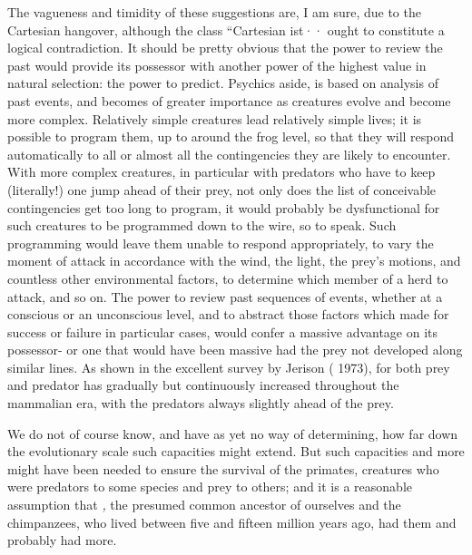 The vagueness and timidity of these suggestions are, I am sure, due to the Cartesian hangover, although the class ``Cartesian \-ist·· ought to constitute a logical contradiction. It should be pretty
obvious that the power to review the past would provide its possessor with another power of the highest value in natural selection: the power to predict. Psychics aside,  is based on analysis of past events, and becomes of greater importance as creatures evolve and become more complex. Relatively simple creatures lead relatively simple lives; it is possible to program them, up to around the frog level, so that they will respond automatically to all or almost all the contingencies they are likely to encounter. With more complex crea\-tures, in particular with predators who have to keep (literally!) one jump ahead of their prey, not only does the list of conceivable contin\-gencies get too long to program, it would probably be dysfunctional for such creatures to be programmed down to the wire, so to speak. Such programming would leave them unable to respond appropriately, to vary the moment of attack in accordance with the wind, the light, the prey's motions, and countless other environmental factors, to determine which member of a herd to attack, and so on. The power to review past sequences of events, whether at a conscious or an un\-conscious level, and to abstract those factors which made for success or failure in particular cases, would confer a massive advantage on its possessor- or one that would have been massive had the prey not de\-veloped along similar lines. As shown in the excellent survey by Jerison ( 1973),  for both prey and predator has gradually but con\-tinuously increased throughout the mammalian era, with the predators always slightly ahead of the prey.

We do not of course know, and have as yet no way of determin\-ing, how far down the evolutionary scale such capacities might extend. But such capacities and more might have been needed to ensure the survival of the primates, creatures who were predators to some species and prey to others; and it is a reasonable assumption that \textit{,} the presumed common ancestor of ourselves and the chimpanzees, who lived between five and fifteen million years ago, had them and probably had more.


